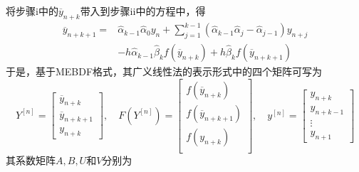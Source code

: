 将步骤i中的$\overline{y}_{n+k}$带入到步骤ii中的方程中，得
\begin{equation}
\begin{aligned}
\overline{y}_{n+k+1}=&\hat{\alpha}_{k-1}\hat{\alpha}_0y_n+\sum_{j=1}^{k-1}(\hat{\alpha}_{k-1}\hat{\alpha}_j-\hat{\alpha}_{j-1})y_{n+j}\\
&-h\hat{\alpha}_{k-1}\hat{\beta}_{k}f(\overline{y}_{n+k})+h\hat{\beta}_{k}f(\overline{y}_{n+k+1})
\end{aligned}
\end{equation}
于是，基于MEBDF格式，其广义线性法的表示形式中的四个矩阵可写为
\begin{equation}
Y^{[n]}=\begin{bmatrix}
\overline{y}_{n+k}\\
\overline{y}_{n+k+1}\\
{y}_{n+k}
\end{bmatrix},\quad F(Y^{[n]})=\begin{bmatrix}
f(\overline{y}_{n+k})\\
f(\overline{y}_{n+k+1})\\
f({y}_{n+k})\\
\end{bmatrix},\quad y^{[n]}=\begin{bmatrix}
y_{n+k}\\
y_{n+k-1}\\
\vdots\\
y_{n+1}
\end{bmatrix}
\end{equation}
其系数矩阵$A,B,U$和$V$分别为
